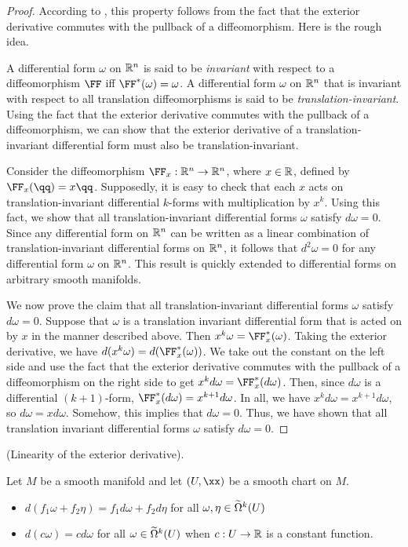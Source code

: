 \begin{proof}
    According to \cite{StackExchangePullbackImpliesdd0}, this property follows from the fact that the exterior derivative commutes with the pullback of a diffeomorphism. Here is the rough idea.
    
    A differential form $\omega$ on $\mathbb{R}^n$ is said to be \textit{invariant} with respect to a diffeomorphism $\FF$ iff $\FF^*(\omega) = \omega$. A differential form $\omega$ on $\mathbb{R}^n$ that is invariant with respect to all translation diffeomorphisms is said to be \textit{translation-invariant}. Using the fact that the exterior derivative commutes with the pullback of a diffeomorphism, we can show that the exterior derivative of a translation-invariant differential form must also be translation-invariant.
    
    Consider the diffeomorphism $\FF_x:\R^n \rightarrow \R^n$, where $x \in \mathbb{R}$, defined by $\FF_x(\qq) = x\qq$. Supposedly, it is easy to check that each $x$ acts on translation-invariant differential $k$-forms with multiplication by $x^k$. Using this fact, we show that all translation-invariant differential forms $\omega$ satisfy $d \omega = 0$. Since any differential form on $\mathbb{R}^n$ can be written as a linear combination of translation-invariant differential forms on $\mathbb{R}^n$, it follows that $d^2 \omega = 0$ for any differential form $\omega$ on $\mathbb{R}^n$. This result is quickly extended to differential forms on arbitrary smooth manifolds.
    
    We now prove the claim that all translation-invariant differential forms $\omega$ satisfy $d \omega = 0$. Suppose that $\omega$ is a translation invariant differential form that is acted on by $x$ in the manner described above. Then $x^k \omega = \FF_x^*(\omega)$. Taking the exterior derivative, we have $d(x^k \omega) = d(\FF_x^*(\omega))$. We take out the constant on the left side and use the fact that the exterior derivative commutes with the pullback of a diffeomorphism on the right side to get $x^k d\omega = \FF_x^*(d\omega)$. Then, since $d\omega$ is a differential $(k + 1)$-form, $\FF_x^*(d\omega) = x^{k + 1} d\omega$. In all, we have $x^k d\omega = x^{k + 1} d \omega$, so $d\omega = xd\omega$. Somehow, this implies that $d \omega = 0$. Thus, we have shown that all translation invariant differential forms $\omega$ satisfy $d \omega = 0$. 
\end{proof}

\newpage

\begin{theorem}
     (Linearity of the exterior derivative).
    
    Let $M$ be a smooth manifold and let $(U, \xx)$ be a smooth chart on $M$.
    
    \begin{itemize}
        \item $d(f_1 \omega + f_2 \eta) = f_1 d \omega + f_2 d \eta$ for all $\omega, \eta \in \widetilde{\Omega}^k(U)$
        \item $d(c \omega) = cd\omega$ for all $\omega \in \widetilde{\Omega}^k(U)$ when $c:U \rightarrow \mathbb{R}$ is a constant function.
    \end{itemize}
\end{theorem}

